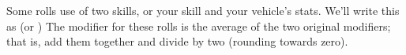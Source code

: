 
Some rolls use of two skills, or your skill and your vehicle's stats. We'll write this as  (or ) The modifier for these rolls is the average of the two original modifiers; that is, add them together and divide by two (rounding towards zero).
